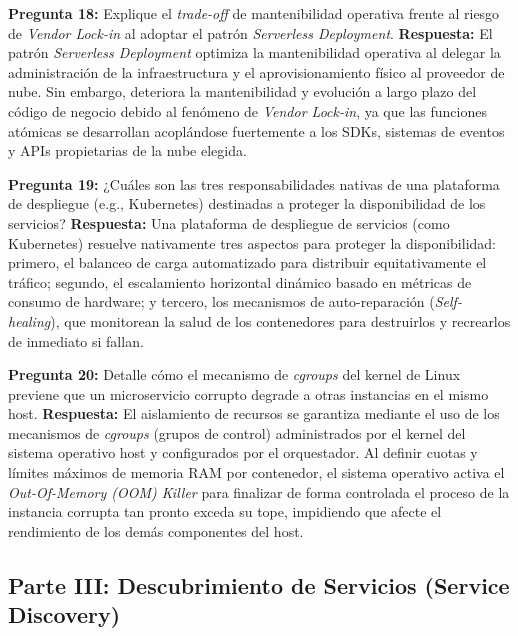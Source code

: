 \noindent\textbf{Pregunta 18:} Explique el \textit{trade-off} de mantenibilidad operativa frente al riesgo de \textit{Vendor Lock-in} al adoptar el patrón \textit{Serverless Deployment}.
\newline
\textbf{Respuesta:} El patrón \textit{Serverless Deployment} optimiza la mantenibilidad operativa al delegar la administración de la infraestructura y el aprovisionamiento físico al proveedor de nube. Sin embargo, deteriora la mantenibilidad y evolución a largo plazo del código de negocio debido al fenómeno de \textit{Vendor Lock-in}, ya que las funciones atómicas se desarrollan acoplándose fuertemente a los SDKs, sistemas de eventos y APIs propietarias de la nube elegida.

\vspace{4mm}

\noindent\textbf{Pregunta 19:} ¿Cuáles son las tres responsabilidades nativas de una plataforma de despliegue (e.g., Kubernetes) destinadas a proteger la disponibilidad de los servicios?
\newline
\textbf{Respuesta:} Una plataforma de despliegue de servicios (como Kubernetes) resuelve nativamente tres aspectos para proteger la disponibilidad: primero, el balanceo de carga automatizado para distribuir equitativamente el tráfico; segundo, el escalamiento horizontal dinámico basado en métricas de consumo de hardware; y tercero, los mecanismos de auto-reparación (\textit{Self-healing}), que monitorean la salud de los contenedores para destruirlos y recrearlos de inmediato si fallan.

\vspace{4mm}

\noindent\textbf{Pregunta 20:} Detalle cómo el mecanismo de \textit{cgroups} del kernel de Linux previene que un microservicio corrupto degrade a otras instancias en el mismo host.
\newline
\textbf{Respuesta:} El aislamiento de recursos se garantiza mediante el uso de los mecanismos de \textit{cgroups} (grupos de control) administrados por el kernel del sistema operativo host y configurados por el orquestador. Al definir cuotas y límites máximos de memoria RAM por contenedor, el sistema operativo activa el \textit{Out-Of-Memory (OOM) Killer} para finalizar de forma controlada el proceso de la instancia corrupta tan pronto exceda su tope, impidiendo que afecte el rendimiento de los demás componentes del host.

\subsection*{Parte III: Descubrimiento de Servicios (Service Discovery)}

